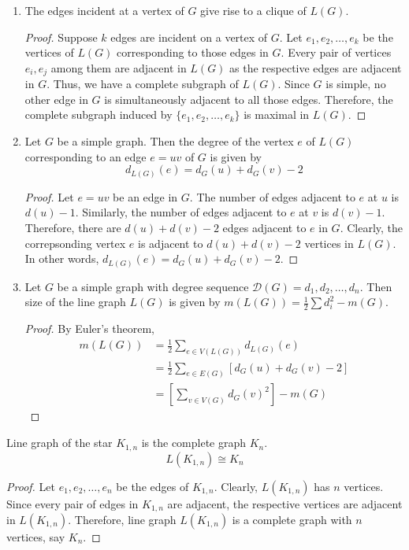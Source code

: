 \begin{enumerate}
\begin{proof}
		Two vertices in $L(H)$ are adjacent if the corresponding edges are adjacent in $H$. Clearly, these edges are adjacent in $G$ as well. Therefore, the vertices are adjacent in $L(G)$ as well. That is, $E(L(H)) \subset E(L(G))$. Therefore $L(H)$ is a subgraph of $L(G)$.
	\end{proof}
	\item The edges incident at a vertex of $G$ give rise to a clique of $L(G)$.
	\begin{proof}
		Suppose $k$ edges are incident on a vertex of $G$. Let $e_1,e_2,\dots,e_k$ be the vertices of $L(G)$ corresponding to those edges in $G$. Every pair of vertices $e_i, e_j$ among them are adjacent in $L(G)$ as the respective edges are adjacent in $G$. Thus, we have a complete subgraph of $L(G)$. Since $G$ is simple, no other edge in $G$ is simultaneously adjacent to all those edges. Therefore, the complete subgraph induced by $\{ e_1,e_2,\dots,e_k \}$ is maximal in $L(G)$.
	\end{proof}
\item Let $G$ be a simple graph. Then the degree of the vertex $e$ of $L(G)$ corresponding to an edge $e = uv$ of $G$ is given by
		$$d_{L(G)}(e) = d_G(u) + d_G(v) - 2$$
	\begin{proof}
		Let $e = uv$ be an edge in $G$. The number of edges adjacent to $e$ at $u$ is $d(u)-1$. Similarly, the number of edges adjacent to $e$ at $v$ is $d(v)-1$. Therefore, there are $d(u)+d(v)-2$ edges adjacent to $e$ in $G$. Clearly, the correpsonding vertex $e$ is adjacent to $d(u)+d(v)-2$ vertices in $L(G)$. In other words, $d_{L(G)}(e) = d_G(u)+d_G(v)-2$.
	\end{proof}
	\item Let $G$ be a simple graph with degree sequence $\mathscr{D}(G) = d_1,d_2,\dots,d_n$.
		Then size of the line graph $L(G)$ is given by $m(L(G)) = \frac{1}{2} \sum d_i^2 - m(G)$.
	\begin{proof}
	By Euler's theorem,
	\begin{align*}
		m(L(G)) 
		& = \frac{1}{2} \sum_{e \in V(L(G))} d_{L(G)}(e) \\
		& = \frac{1}{2} \sum_{e \in E(G)} \left[ d_G(u)+d_G(v)-2 \right] \\
		& = \left[ \sum_{v \in V(G)} d_G(v)^2 \right] - m(G) 
	\end{align*}
	\end{proof}
\end{enumerate}

\begin{exercise}
	Line graph of the star $K_{1,n}$ is the complete graph $K_n$.
	$$L(K_{1,n}) \cong K_n$$
\end{exercise}
\begin{proof}
	Let $e_1,e_2,\dots,e_n$ be the edges of $K_{1,n}$.
	Clearly, $L(K_{1,n})$ has $n$ vertices.
	Since every pair of edges in $K_{1,n}$ are adjacent, the respective vertices are adjacent in $L(K_{1,n})$.
	Therefore, line graph $L(K_{1,n})$ is a complete graph with $n$ vertices, say $K_n$.
\end{proof}

